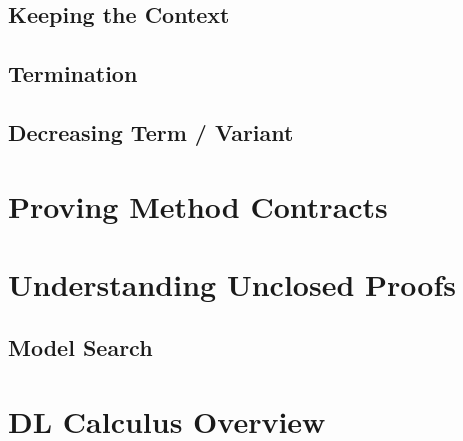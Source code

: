 \documentclass[a4paper, 11pt, accentcolor = tud3b]{tudreport}
\begin{document}
            \subsection{Keeping the Context} %

            \subsection{Termination} %

            \subsection{Decreasing Term / Variant} %

        \section{Proving Method Contracts} %

        \section{Understanding Unclosed Proofs} %

            \subsection{Model Search} %

        \section{DL Calculus Overview} %
\end{document}

